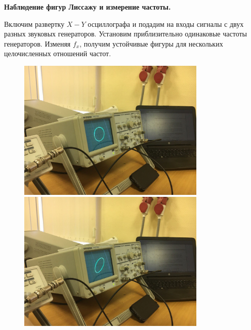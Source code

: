 \documentclass[14pt]{article}
\begin{document}
\vspace{0.5cm}
\textbf{Наблюдение фигур Лиссажу и измерение частоты.}

Включим развертку $X-Y$ осциллографа и подадим на входы сигналы с двух разных звуковых генераторов. Установим приблизительно одинаковые частоты генераторов. Изменяя $f_x$, получим устойчивые фигуры для нескольких целочисленных отношений частот. 


\newpage
\begin{figure}[h!]
	\includegraphics[width = 9cm]{lis_1_1}
	\includegraphics[width = 9cm]{lis_1_2}
	\label{fig:image}
\end{figure}
\end{document}
